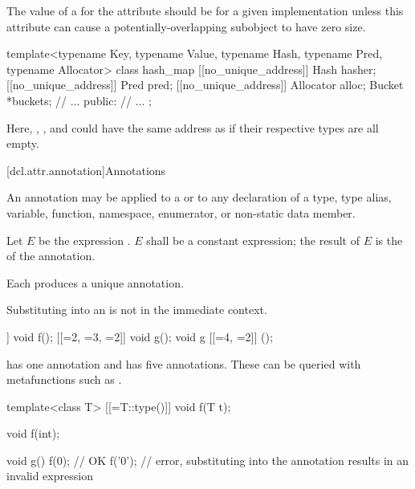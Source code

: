\recommended
The value of a 
for the  attribute
should be  for a given implementation
unless this attribute can cause a potentially-overlapping subobject
to have zero size.

\begin{example}
\begin{codeblock}
template<typename Key, typename Value,
         typename Hash, typename Pred, typename Allocator>
class hash_map {
  [[no_unique_address]] Hash hasher;
  [[no_unique_address]] Pred pred;
  [[no_unique_address]] Allocator alloc;
  Bucket *buckets;
  // ...
public:
  // ...
};
\end{codeblock}
Here, , , and 
could have the same address as 
if their respective types are all empty.
\end{example}

[dcl.attr.annotation]{Annotations}%

\pnum
An annotation may be applied
to a  or
to any declaration of a
type,
type alias,
variable,
function,
namespace,
enumerator, or
non-static data member.

\pnum
Let $E$ be the expression
.
$E$ shall be a constant expression;
the result of $E$ is the  of the annotation.

\pnum
Each  produces a unique annotation.

\pnum
Substituting into an 
is not in the immediate context.
\begin{example}
\begin{codeblock}
[[=1]] void f();
[[=2, =3, =2]] void g();
void g [[=4, =2]] ();
\end{codeblock}
 has one annotation
and  has five annotations.
These can be queried with metafunctions
such as .
\end{example}
\begin{example}
\begin{codeblock}
template<class T>
  [[=T::type()]] void f(T t);

void f(int);

void g() {
  f(0);         // OK
  f('0');       // error, substituting into the annotation results in an invalid expression
}
\end{codeblock}
\end{example}

%
